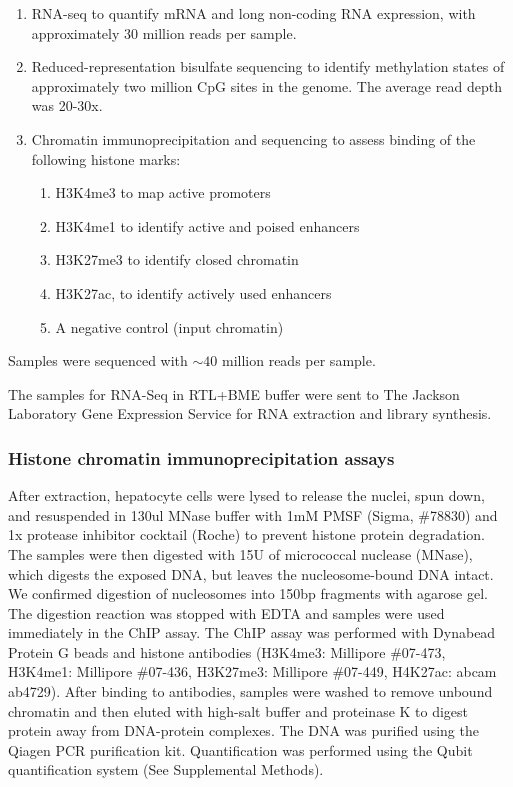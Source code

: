 \documentclass[
  11pt,
]{article}
\providecommand{\tightlist}{%
  \setlength{\itemsep}{0pt}\setlength{\parskip}{0pt}}
\begin{document}
\begin{enumerate}
\def\labelenumi{\arabic{enumi}.}
\tightlist
\item
  RNA-seq to quantify mRNA and long non-coding RNA expression, with
  approximately 30 million reads per sample.
\item
  Reduced-representation bisulfate sequencing to identify methylation
  states of approximately two million CpG sites in the genome. The
  average read depth was 20-30x.
\item
  Chromatin immunoprecipitation and sequencing to assess binding of the
  following histone marks:

  \begin{enumerate}
  \def\labelenumii{\alph{enumii}.}
  \tightlist
  \item
    H3K4me3 to map active promoters
  \item
    H3K4me1 to identify active and poised enhancers
  \item
    H3K27me3 to identify closed chromatin
  \item
    H3K27ac, to identify actively used enhancers
  \item
    A negative control (input chromatin)
  \end{enumerate}
\end{enumerate}

Samples were sequenced with \(\sim40\) million reads per sample.

The samples for RNA-Seq in RTL+BME buffer were sent to The Jackson
Laboratory Gene Expression Service for RNA extraction and library
synthesis.

\hypertarget{histone-chromatin-immunoprecipitation-assays}{%
\subsubsection{Histone chromatin immunoprecipitation
assays}\label{histone-chromatin-immunoprecipitation-assays}}

After extraction, hepatocyte cells were lysed to release the nuclei,
spun down, and resuspended in 130ul MNase buffer with 1mM PMSF (Sigma,
\#78830) and 1x protease inhibitor cocktail (Roche) to prevent histone
protein degradation. The samples were then digested with 15U of
micrococcal nuclease (MNase), which digests the exposed DNA, but leaves
the nucleosome-bound DNA intact. We confirmed digestion of nucleosomes
into 150bp fragments with agarose gel. The digestion reaction was
stopped with EDTA and samples were used immediately in the ChIP assay.
The ChIP assay was performed with Dynabead Protein G beads and histone
antibodies (H3K4me3: Millipore \#07-473, H3K4me1: Millipore \#07-436,
H3K27me3: Millipore \#07-449, H4K27ac: abcam ab4729). After binding to
antibodies, samples were washed to remove unbound chromatin and then
eluted with high-salt buffer and proteinase K to digest protein away
from DNA-protein complexes. The DNA was purified using the Qiagen PCR
purification kit. Quantification was performed using the Qubit
quantification system (See Supplemental Methods).
\end{document}

